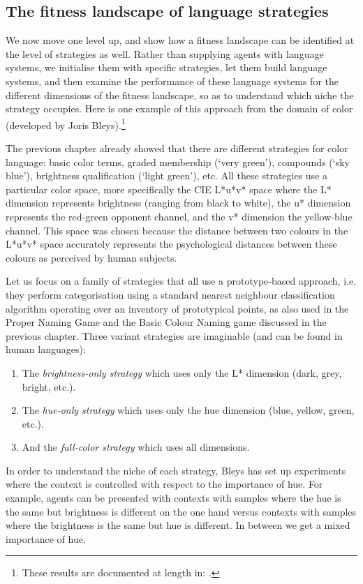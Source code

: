 \subsection{The fitness landscape of language strategies}

We now move one level up, and show how a fitness landscape can be identified at the level of strategies as well. Rather than supplying 
agents with language systems, we initialise them 
with specific strategies, let them build language systems, and then examine the performance 
of these language systems for the different dimensions of the fitness landscape, so as to understand which niche 
the strategy occupies. Here is one example of this approach 
from the domain of color (developed by Joris Bleys).\footnote{These results are documented at length in: \cite{Bleys:2014}.}

The previous chapter already showed that there are 
different strategies for color language: basic color terms, graded membership (`very green'), compounds (`sky blue'), 
brightness qualification (`light green'), etc. All these strategies use a particular color space, more specifically 
the CIE L*u*v* space where the L* dimension represents brightness (ranging from black to white), the u* 
dimension represents the red-green opponent channel, 
and the v* dimension the yellow-blue channel. This space was chosen 
because the distance between two colours in the L*u*v* space accurately represents 
the psychological distances between these colours as perceived by human subjects. 

Let us focus on a family of strategies that all use a prototype-based approach, i.e. they perform categorisation using 
a standard nearest neighbour classification algorithm operating over an inventory of prototypical points, 
as also used in the Proper Naming Game and the Basic Colour Naming game discussed in the previous chapter. 
Three variant strategies are imaginable (and can be found in human languages): 
\begin{enumerate}
\item The {\itshape brightness-only strategy} which uses only the L* dimension (dark, grey, bright, etc.).
\item The {\itshape hue-only strategy} which uses only the hue dimension (blue, yellow, green, etc.). 
\item And the {\itshape full-color strategy} which uses all dimensions. 
\end{enumerate}
In order to understand the niche of each strategy, Bleys has set up experiments where the context is controlled 
with respect to the importance of hue. 
For example, agents can be presented with contexts with samples where the hue is the same but brightness is different on the one 
hand versus contexts with samples where the brightness is the same but hue is different. In between we get a mixed 
importance of hue. 


